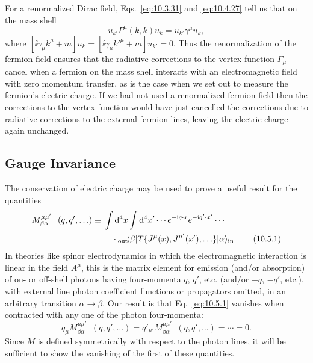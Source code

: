 
For a renormalized Dirac field, Eqs.~\eqref{eq:10.3.31} and
\eqref{eq:10.4.27} tell us that on the mass shell
\begin{equation}
  \bar u_{k'}\Gamma^\mu(k,k)u_k=\bar u_{k'}\gamma^\mu u_k,
  \tag{10.4.28}\label{eq:10.4.28}
\end{equation}
where $[\ii\gamma_\mu k^\mu+m]u_k=[\ii\gamma_\mu k'^\mu+m]u_{k'}=0$.
Thus the renormalization of the fermion field ensures that the radiative
corrections to the vertex function $\Gamma_\mu$ cancel when a fermion on the
mass shell interacts with an electromagnetic field with zero momentum
transfer, as is the case when we set out to measure the fermion's electric
charge. If we had not used a renormalized fermion field then the corrections
to the vertex function would have just cancelled the corrections due to
radiative corrections to the external fermion lines, leaving the electric
charge again unchanged.

\subsection{Gauge Invariance}

The conservation of electric charge may be used to prove a useful result for
the quantities
\begin{align}
  M^{\mu\mu'\cdots}_{\beta\alpha}(q,q',\ldots)
  \equiv{}&\int \mathop{}\!\mathrm{d}^4x\int \mathop{}\!\mathrm{d}^4x'\cdots
  e^{-\mathrm{i} q\cdot x}e^{-\mathrm{i} q'\cdot x'}\cdots \notag\\
  &\quad\cdot
  {}_{\mathrm{out}}\!\langle \beta\rvert
  T\{J^\mu(x),J^{\mu'}(x'),\ldots\}
  \lvert \alpha\rangle_{\mathrm{in}}.
  \tag{10.5.1}\label{eq:10.5.1}
\end{align}
In theories like spinor electrodynamics in which the electromagnetic
interaction is linear in the field $A^\mu$, this is the matrix element for
emission (and/or absorption) of on- or off-shell photons having four-momenta
$q$, $q'$, etc. (and/or $-q$, $-q'$, etc.), with external line photon
coefficient functions or propagators omitted, in an arbitrary transition
$\alpha\to\beta$. Our result is that Eq.~\eqref{eq:10.5.1} vanishes when
contracted with any one of the photon four-momenta:
\begin{equation}
  q_\mu M^{\mu\mu'\cdots}_{\beta\alpha}(q,q',\ldots)
  =q'_{\mu'}M^{\mu\mu'\cdots}_{\beta\alpha}(q,q',\ldots)
  =\cdots=0.
  \tag{10.5.2}\label{eq:10.5.2}
\end{equation}
Since $M$ is defined symmetrically with respect to the photon lines, it will
be sufficient to show the vanishing of the first of these quantities.

